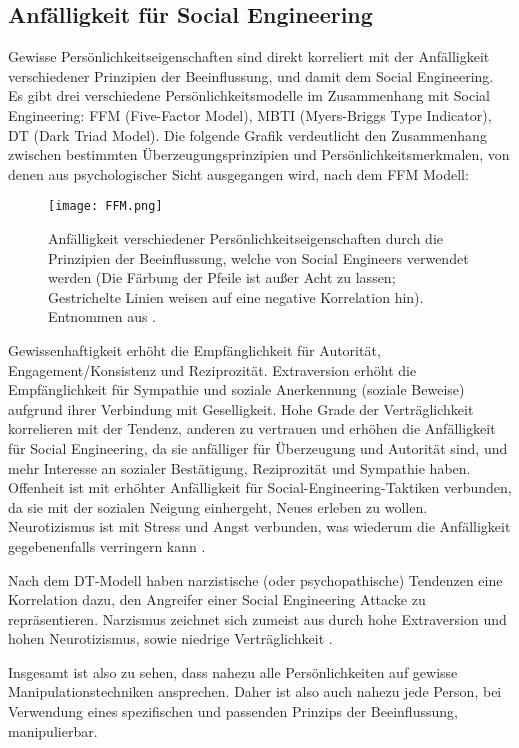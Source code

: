 \subsection{Anfälligkeit für Social Engineering}

Gewisse Persönlichkeitseigenschaften sind direkt korreliert mit der Anfälligkeit verschiedener Prinzipien der Beeinflussung, und damit dem Social Engineering.
Es gibt drei verschiedene Persönlichkeitsmodelle im Zusammenhang mit Social Engineering: FFM (Five-Factor Model), MBTI (Myers-Briggs Type Indicator), DT (Dark Triad Model).
Die folgende Grafik verdeutlicht den Zusammenhang zwischen bestimmten Überzeugungsprinzipien und Persönlichkeitsmerkmalen, von denen aus psychologischer Sicht ausgegangen wird, nach dem FFM Modell:

\begin{figure}[!htp]
    \centering
    \texttt{[image: FFM.png]}
    \caption{Anfälligkeit verschiedener Persönlichkeitseigenschaften durch die Prinzipien der Beeinflussung, welche von Social Engineers verwendet werden (Die Färbung der Pfeile ist außer Acht zu lassen; Gestrichelte Linien weisen auf eine negative Korrelation hin). Entnommen aus .}
\end{figure}
\FloatBarrier

Gewissenhaftigkeit erhöht die Empfänglichkeit für Autorität, Engagement/Konsistenz und Reziprozität.
Extraversion erhöht die Empfänglichkeit für Sympathie und soziale Anerkennung (soziale Beweise) aufgrund ihrer Verbindung mit Geselligkeit.
Hohe Grade der Verträglichkeit korrelieren mit der Tendenz, anderen zu vertrauen und erhöhen die Anfälligkeit für Social Engineering, da sie anfälliger für Überzeugung und Autorität sind,
und mehr Interesse an sozialer Bestätigung, Reziprozität und Sympathie haben.
Offenheit ist mit erhöhter Anfälligkeit für Social-Engineering-Taktiken verbunden, da sie mit der sozialen Neigung einhergeht, Neues erleben zu wollen.
Neurotizismus ist mit Stress und Angst verbunden, was wiederum die Anfälligkeit gegebenenfalls verringern kann .

Nach dem DT-Modell haben narzistische (oder psychopathische) Tendenzen eine Korrelation dazu, den Angreifer einer Social Engineering Attacke zu repräsentieren.
Narzismus zeichnet sich zumeist aus durch hohe Extraversion und hohen Neurotizismus, sowie niedrige Verträglichkeit .

Insgesamt ist also zu sehen, dass nahezu alle Persönlichkeiten auf gewisse Manipulationstechniken ansprechen.
Daher ist also auch nahezu jede Person, bei Verwendung eines spezifischen und passenden Prinzips der Beeinflussung, manipulierbar.
